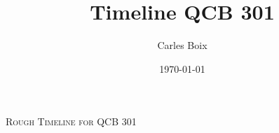 \documentclass[landscape,a4paper]{article}
\title{Timeline QCB 301}
\author{Carles Boix}
\date{\today} %
\begin{document}

\noindent

 

\begin{center}
\textsc{\LARGE Rough Timeline for QCB 301}\\ %
\end{center}
\end{document}
